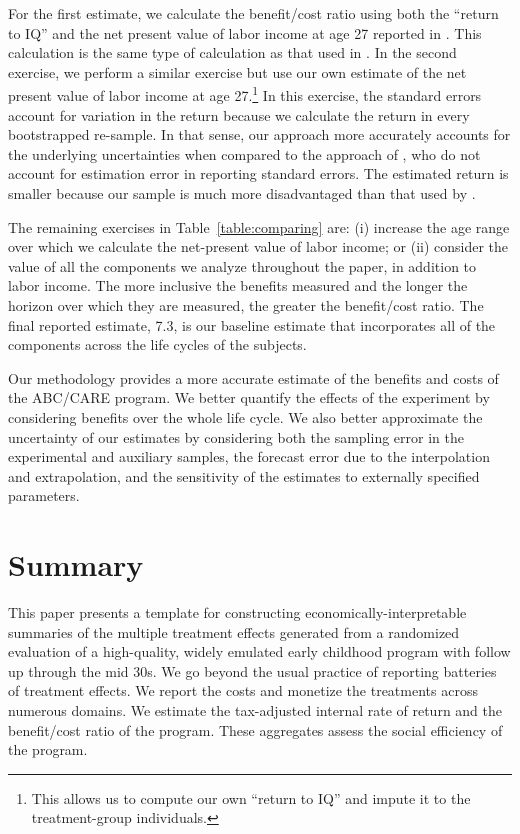 For the first estimate, we calculate the benefit/cost ratio using both the ``return to IQ'' and the net present value of labor income at age 27 reported in \citet{Chetty_Friedman_etal_2011_QJoE}. This calculation is the same type of calculation as that used in \citet{Kline_Walters_2016_QJE}. In the second exercise, we perform a similar exercise but use our own estimate of the net present value of labor income at age 27.\footnote{This allows us to compute our own ``return to IQ'' and impute it to the treatment-group individuals.} In this exercise, the standard errors account for variation in the return because we calculate the return in every bootstrapped re-sample. In that sense, our approach more accurately accounts for the underlying uncertainties when compared to the approach of \citet{Kline_Walters_2016_QJE}, who do not account for estimation error in reporting standard errors. The estimated return is smaller because our sample is much more disadvantaged than that used by \citet{Chetty_Friedman_etal_2011_QJoE}.

The remaining exercises in Table~\ref{table:comparing} are: (i) increase the age range over which we calculate the net-present value of labor income; or (ii) consider the value of all the components we analyze throughout the paper, in addition to labor income. The more inclusive the benefits measured and the longer the horizon over which they are measured, the greater the benefit/cost ratio. The final reported estimate, 7.3, is our baseline estimate that incorporates all of the components across the life cycles of the subjects.

Our methodology provides a more accurate estimate of the benefits and costs of the ABC/CARE program. We better quantify the effects of the experiment by considering benefits over the whole life cycle. We also better approximate the uncertainty of our estimates by considering both the sampling error in the experimental and auxiliary samples, the forecast error due to the interpolation and extrapolation, and the sensitivity of the estimates to externally specified parameters.

\section{Summary} \label{section:conclusion}

\noindent This paper presents a template for constructing economically-interpretable summaries of the multiple treatment effects generated from a randomized evaluation of a high-quality, widely emulated early childhood program with follow up through the mid 30s. We go beyond the usual practice of reporting batteries of treatment effects. We report the costs and monetize the treatments across numerous domains. We estimate the tax-adjusted internal rate of return and the benefit/cost ratio of the program. These aggregates assess the social efficiency of the program.


